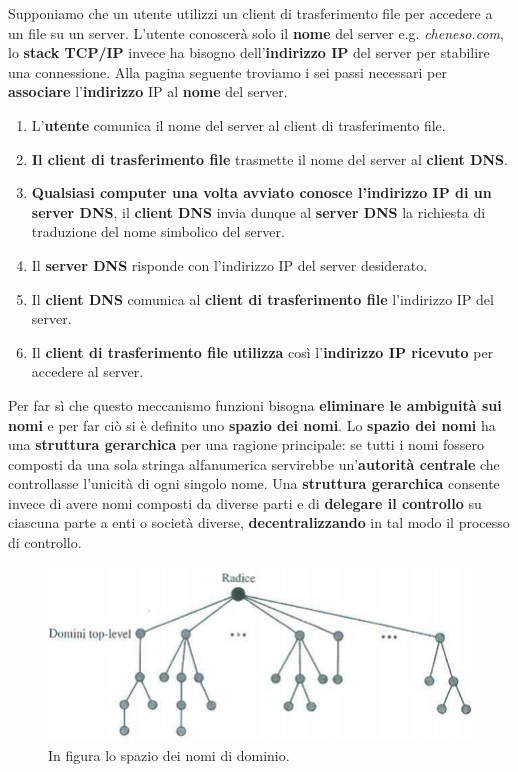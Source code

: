 \documentclass[11pt,a4paper]{article}
\theoremstyle{definition}
\begin{document}
Supponiamo che un utente utilizzi un client di trasferimento file per accedere a un file su un server. L'utente conoscerà solo il \textbf{nome} del server e.g. \textit{cheneso.com}, lo \textbf{stack TCP/IP} invece ha bisogno dell'\textbf{indirizzo IP} del server per stabilire una connessione. Alla pagina seguente troviamo i sei passi necessari per \textbf{associare} l'\textbf{indirizzo} IP al \textbf{nome} del server.
\newpage
\begin{enumerate}
	\item L'\textbf{utente} comunica il nome del server al client di trasferimento file.
	\item \textbf{Il client di trasferimento file} trasmette il nome del server al \textbf{client DNS}.
	\item \textbf{Qualsiasi computer una volta avviato conosce l'indirizzo IP di un server DNS}, il \textbf{client DNS} invia dunque al \textbf{server DNS} la richiesta di traduzione del nome simbolico del server.
	\item Il \textbf{server DNS} risponde con l'indirizzo IP del server desiderato.
	\item Il \textbf{client DNS} comunica al \textbf{client di trasferimento file} l'indirizzo IP del server.
	\item Il \textbf{client di trasferimento file} \textbf{utilizza} così l'\textbf{indirizzo IP ricevuto} per accedere al server.
\end{enumerate}
Per far sì che questo meccanismo funzioni bisogna \textbf{eliminare le ambiguità sui nomi} e per far ciò si è definito uno \textbf{spazio dei nomi}. Lo \textbf{spazio dei nomi} ha una \textbf{struttura gerarchica} per una ragione principale: se tutti i nomi fossero composti da una sola stringa alfanumerica servirebbe un'\textbf{autorità centrale} che controllasse l'unicità di ogni singolo nome. Una \textbf{struttura gerarchica} consente invece di avere nomi composti da diverse parti e di \textbf{delegare il controllo} su ciascuna parte a enti o società diverse, \textbf{decentralizzando} in tal modo il processo di controllo.
\begin{figure}[!h]
	\includegraphics[scale=0.7]{Immagini/DNSpace.png}
	\centering
	\caption{In figura lo spazio dei nomi di dominio.}
\end{figure}\newline
\end{document}
